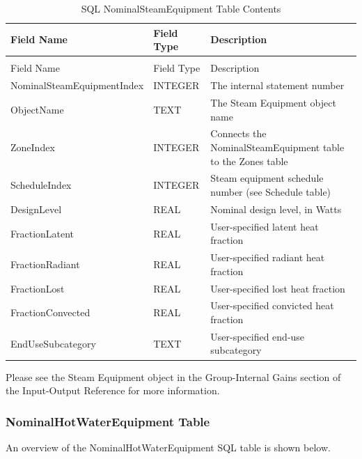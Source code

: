 {\scriptsize
\begin{longtable}[c]{>{\raggedright}p{1.5in}>{\raggedright}p{1.5in}>{\raggedright}p{2.99in}}
\caption{SQL NominalSteamEquipment Table Contents \label{table:table-19.-sql-nominalsteamequipment-table}} \tabularnewline
\toprule
Field Name & Field Type & Description \tabularnewline
\midrule
\endfirsthead

\caption[]{SQL NominalSteamEquipment Table Contents} \tabularnewline
\toprule
Field Name & Field Type & Description \tabularnewline
\midrule
\endhead

Nominal\-Steam\-Equipment\-Index & INTEGER & The internal statement number \tabularnewline
ObjectName & TEXT & The Steam Equipment object name \tabularnewline
ZoneIndex & INTEGER & Connects the NominalSteamEquipment table to the Zones table \tabularnewline
ScheduleIndex & INTEGER & Steam equipment schedule number (see Schedule table) \tabularnewline
DesignLevel & REAL & Nominal design level, in Watts \tabularnewline
FractionLatent & REAL & User-specified latent heat fraction \tabularnewline
FractionRadiant & REAL & User-specified radiant heat fraction \tabularnewline
FractionLost & REAL & User-specified lost heat fraction \tabularnewline
FractionConvected & REAL & User-specified convicted heat fraction \tabularnewline
EndUseSubcategory & TEXT & User-specified end-use subcategory \tabularnewline
\bottomrule
\end{longtable}}

Please see the Steam Equipment object in the Group-Internal Gains section of the Input-Output Reference for more information.

\subsubsection{NominalHotWaterEquipment Table}

An overview of the NominalHotWaterEquipment SQL table is shown below.

